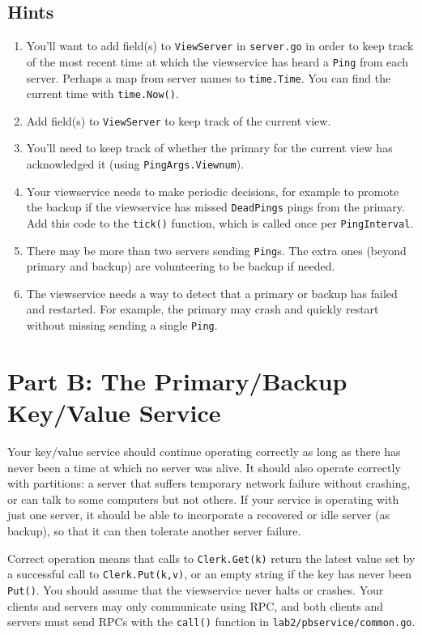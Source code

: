 \documentclass{article}
\newcommand{\code}{\texttt}
\begin{document}
\subsection{Hints}
\begin{enumerate}
    \item You'll want to add field(s) to \code{ViewServer} in \code{server.go} in order to keep track of the most recent time at which the viewservice has heard a \code{Ping} from each server. Perhaps a map from server names to \code{time.Time}. You can find the current time with \code{time.Now()}.
    \item Add field(s) to \code{ViewServer} to keep track of the current view.
    \item You'll need to keep track of whether the primary for the current view has acknowledged it (using \code{PingArgs.Viewnum}).
    \item Your viewservice needs to make periodic decisions, for example to promote the backup if the viewservice has missed \code{DeadPings} pings from the primary. Add this code to the \code{tick()} function, which is called once per \code{PingInterval}. 
    \item There may be more than two servers sending \code{Ping}s. The extra ones (beyond primary and backup) are volunteering to be backup if needed.
    \item The viewservice needs a way to detect that a primary or backup has failed and restarted. For example, the primary may crash and quickly restart without missing sending a single \code{Ping}. 
\end{enumerate}

\section{Part B: The Primary/Backup Key/Value Service}
Your key/value service should continue operating correctly as long as there has never been a time at which no server was alive. It should also operate correctly with partitions: a server that suffers temporary network failure without crashing, or can talk to some computers but not others. If your service is operating with just one server, it should be able to incorporate a recovered or idle server (as backup), so that it can then tolerate another server failure. 

Correct operation means that calls to \code{Clerk.Get(k)} return the latest value set by a successful call to \code{Clerk.Put(k,v)}, or an empty string if the key has never been \code{Put()}. You should assume that the viewservice never halts or crashes. Your clients and servers may only communicate using RPC, and both clients and servers must send RPCs with the \code{call()} function in \code{lab2/pbservice/common.go}.
\end{document}
